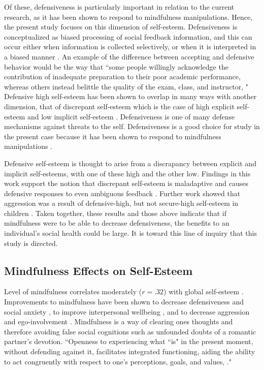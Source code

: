 \documentclass[jou]{apa}
\begin{document}
Of these, defensiveness is particularly important in relation to the current research, as it has been shown to respond to mindfulness manipulations.   Hence, the present study focuses on this dimension of self-esteem. Defensiveness is conceptualized as biased processing of social feedback information, and this can occur either when information is collected selectively, or when it is interpreted in a biased manner \cite{schroder2007}.   An example of the difference between accepting and defensive behavior would be the way that ``some people willingly acknowledge the contribution of inadequate preparation to their poor academic performance, whereas others instead belittle the quality of the exam, class, and instructor, \cite{lakey2008}"  Defensive high self-esteem has been shown to overlap in many ways with another dimension, that of discrepant self-esteem \cite{lambird2006} which is the case of high explicit self-esteem and low implicit self-esteem \cite{jordan2006}.  Defensiveness is one of many defense mechanisms against threats to the self.  Defensiveness is a good choice for study in the present case because it has been shown to respond to mindfulness manipulations \cite{lakey2008}.  


Defensive self-esteem is thought to arise from a discrapancy between explicit and implicit self-esteems, with one of these high and the other low.    Findings in this work support the notion that discrepant self-esteem is maladaptive and causes defensive responses to even ambiguous feedback \cite{schroder2007}.  Further work showed that aggression was a result of defensive-high, but not secure-high self-esteem in children \cite{sandstrom2008}.  Taken together, these results and those above indicate that if mindfulness were to be able to decrease defensiveness, the benefits to an individual's social health could be large.  It is toward this line of inquiry that this study is directed.  


\subsection{Mindfulness Effects on Self-Esteem}

Level of mindfulness correlates moderately ($r=.32$) with global self-esteem \cite{lakey2008}.  Improvements to mindfulness have been shown to decrease defensiveness \cite{lakey2008} and social anxiety \cite{rasmussen2011}, to improve interpersonal wellbeing \cite{cohen2009}, and to decrease aggression and ego-involvement \cite{kernis2010}.  Mindfulness is a way of clearing ones thoughts and therefore avoiding false social cognitions such as unfounded doubts of a romantic partner's devotion.  ``Openness to experiencing what ``is" in the present moment, without defending against it, facilitates integrated functioning, aiding the ability to act congruently with respect to one's perceptions, goals, and values, \cite{ryan2003}."
\end{document}
